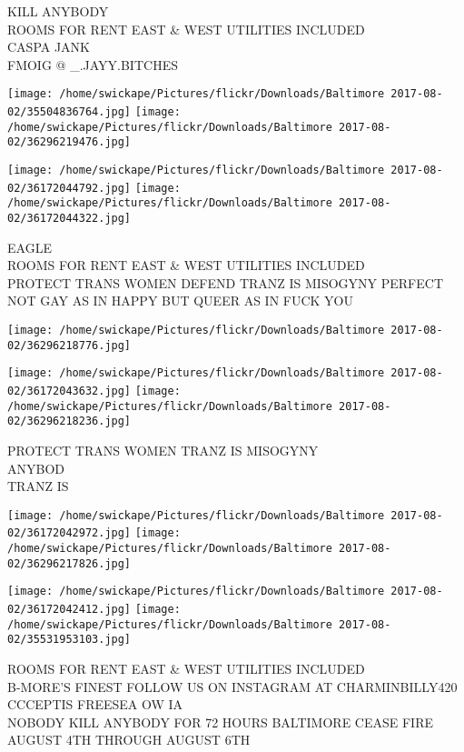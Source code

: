 \documentclass[10pt,letterpaper]{article}
\begin{document}
KILL ANYBODY\\
ROOMS FOR RENT EAST \& WEST UTILITIES INCLUDED\\
CASPA JANK\\
FMOIG @ \_.JAYY.BITCHES\\
\pagebreak

\texttt{[image: /home/swickape/Pictures/flickr/Downloads/Baltimore 2017-08-02/35504836764.jpg]}
\texttt{[image: /home/swickape/Pictures/flickr/Downloads/Baltimore 2017-08-02/36296219476.jpg]}

\texttt{[image: /home/swickape/Pictures/flickr/Downloads/Baltimore 2017-08-02/36172044792.jpg]}
\texttt{[image: /home/swickape/Pictures/flickr/Downloads/Baltimore 2017-08-02/36172044322.jpg]}

EAGLE\\
ROOMS FOR RENT EAST \& WEST UTILITIES INCLUDED\\
PROTECT TRANS WOMEN DEFEND TRANZ IS MISOGYNY PERFECT\\
NOT GAY AS IN HAPPY BUT QUEER AS IN FUCK YOU\\
\pagebreak

\texttt{[image: /home/swickape/Pictures/flickr/Downloads/Baltimore 2017-08-02/36296218776.jpg]}

\vspace{0.25in}
\texttt{[image: /home/swickape/Pictures/flickr/Downloads/Baltimore 2017-08-02/36172043632.jpg]}
\texttt{[image: /home/swickape/Pictures/flickr/Downloads/Baltimore 2017-08-02/36296218236.jpg]}

PROTECT TRANS WOMEN TRANZ IS MISOGYNY\\
ANYBOD\\
TRANZ IS\\
\pagebreak

\texttt{[image: /home/swickape/Pictures/flickr/Downloads/Baltimore 2017-08-02/36172042972.jpg]}
\texttt{[image: /home/swickape/Pictures/flickr/Downloads/Baltimore 2017-08-02/36296217826.jpg]}

\texttt{[image: /home/swickape/Pictures/flickr/Downloads/Baltimore 2017-08-02/36172042412.jpg]}
\texttt{[image: /home/swickape/Pictures/flickr/Downloads/Baltimore 2017-08-02/35531953103.jpg]}

ROOMS FOR RENT EAST \& WEST UTILITIES INCLUDED\\
B{-}MORE'S FINEST FOLLOW US ON INSTAGRAM AT CHARMINBILLY420\\
CCCEPTIS FREESEA OW IA\\
NOBODY KILL ANYBODY FOR 72 HOURS BALTIMORE CEASE FIRE AUGUST 4TH THROUGH AUGUST 6TH\\
\pagebreak
\end{document}
